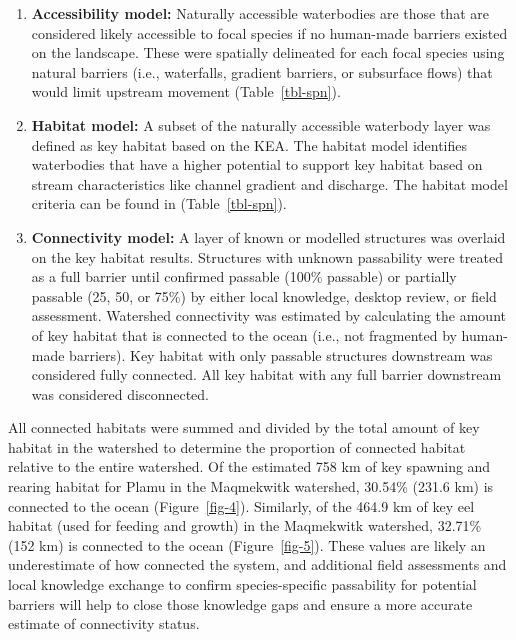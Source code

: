 \documentclass[
  letterpaper,
  DIV=11,
  numbers=noendperiod]{scrreprt}
\begin{document}
\begin{enumerate}
\def\labelenumi{\arabic{enumi}.}
\item
  \textbf{Accessibility model:} Naturally accessible waterbodies are
  those that are considered likely accessible to focal species if no
  human-made barriers existed on the landscape. These were spatially
  delineated for each focal species using natural barriers (i.e.,
  waterfalls, gradient barriers, or subsurface flows) that would limit
  upstream movement (Table~\ref{tbl-spn}).
\item
  \textbf{Habitat model:} A subset of the naturally accessible waterbody
  layer was defined as key habitat based on the KEA. The habitat model
  identifies waterbodies that have a higher potential to support key
  habitat based on stream characteristics like channel gradient and
  discharge. The habitat model criteria can be found in
  (Table~\ref{tbl-spn}).
\item
  \textbf{Connectivity model:} A layer of known or modelled structures
  was overlaid on the key habitat results. Structures with unknown
  passability were treated as a full barrier until confirmed passable
  (100\% passable) or partially passable (25, 50, or 75\%) by either
  local knowledge, desktop review, or field assessment. Watershed
  connectivity was estimated by calculating the amount of key habitat
  that is connected to the ocean (i.e., not fragmented by human-made
  barriers). Key habitat with only passable structures downstream was
  considered fully connected. All key habitat with any full barrier
  downstream was considered disconnected.
\end{enumerate}

All connected habitats were summed and divided by the total amount of
key habitat in the watershed to determine the proportion of connected
habitat relative to the entire watershed. Of the estimated 758 km of key
spawning and rearing habitat for Plamu in the Maqmekwitk watershed,
30.54\% (231.6 km) is connected to the ocean (Figure~\ref{fig-4}).
Similarly, of the 464.9 km of key eel habitat (used for feeding and
growth) in the Maqmekwitk watershed, 32.71\% (152 km) is connected to
the ocean (Figure~\ref{fig-5}). These values are likely an underestimate
of how connected the system, and additional field assessments and local
knowledge exchange to confirm species-specific passability for potential
barriers will help to close those knowledge gaps and ensure a more
accurate estimate of connectivity status.
\end{document}
